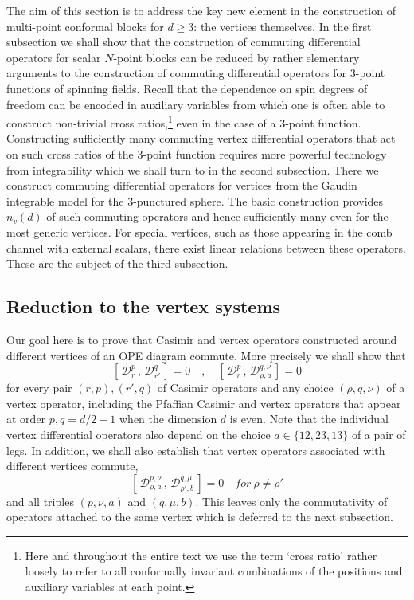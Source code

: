 \documentclass{article}
\begin{document}
The aim of this section is to address the key new element in the construction 
of multi-point conformal blocks for $d \geq 3$: the vertices themselves. In the first subsection we shall show that the 
construction of commuting differential operators for scalar $N$-point 
blocks can be reduced by rather elementary arguments to the construction of 
commuting differential operators for 3-point functions of spinning fields. 
Recall that the dependence on spin degrees of freedom can be encoded in 
auxiliary variables from which one is often able to construct non-trivial 
cross ratios,\footnote{Here and throughout the entire text we use the term 
`cross ratio' rather loosely to refer to all conformally invariant 
combinations of the positions and auxiliary variables at each point.} even 
in the case of a 3-point function. Constructing sufficiently
many commuting vertex differential operators that act on such cross ratios of 
the 3-point function requires more powerful technology from integrability which 
we shall turn to in the second subsection. 
There we construct commuting differential operators for vertices 
from the Gaudin integrable model for the 3-punctured sphere. The 
basic construction provides $n_v(d)$ of such commuting operators and 
hence sufficiently many even for the most generic vertices. For 
special vertices, such as those appearing in the comb channel with external scalars, 
there exist linear relations between these operators. These are the 
subject of the third subsection. 

\subsection{Reduction to the vertex systems}
\label{sec:red}

Our goal here is to prove that Casimir and vertex operators constructed around 
different vertices of an OPE diagram commute. More precisely we shall show that 
\begin{equation} \label{eq:commCDO} 
[\, \mathcal{D}^{p}_r\,, \, \mathcal{D}^{q}_{r'} \, ]  = 0 \quad , \quad
[\, \mathcal{D}^p_r\, ,\, \mathcal{D}^{q,\nu}_{\rho,a} \,] = 0 
\end{equation} 
for every pair $(r,p),(r',q)$ of Casimir operators and any choice $(\rho,q,\nu)$ 
of a vertex operator, including the Pfaffian Casimir and vertex operators that 
appear at order $p,q=d/2 + 1$ when the dimension $d$ is even. Note that the 
individual vertex differential operators also depend on the choice $a \in 
\{12,23,13\}$ of a pair of legs. In addition, we shall also establish that 
vertex operators associated with different vertices commute, 
\begin{equation} \label{eq:commVDO1}
[\, \mathcal{D}^{p,\nu}_{\rho,a}\, ,\, \mathcal{D}^{q,\mu}_{\rho',b} \,] = 0 \quad 
\mathit{ for } \ \rho \neq \rho'
\end{equation}
and all triples $(p,\nu,a)$ and $(q,\mu,b)$. This leaves only the commutativity of operators attached to the same vertex which is deferred to the next subsection. 
\medskip 
\end{document}
